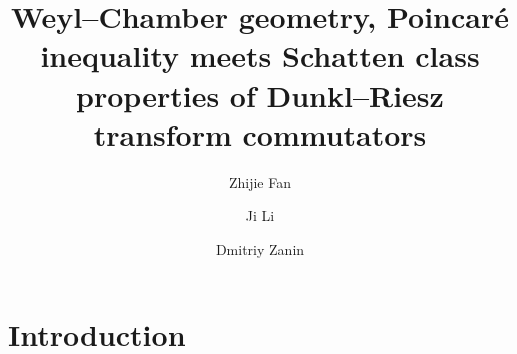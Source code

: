 \documentclass{amsart}
\begin{document}
\newtheorem{theorem}{Theorem}[section]
\newtheorem{proposition}[theorem]{Proposition}
\newtheorem{coro}[theorem]{Corollary}
\newtheorem{lemma}[theorem]{Lemma}
\newtheorem{definition}[theorem]{Definition}
\newtheorem{nota}[theorem]{Notation}
\newtheorem{assum}{Assumption}[section]
\newtheorem{example}[theorem]{Example}
\newtheorem{remark}[theorem]{Remark}


\title[Schatten class properties of Dunkl--Riesz transform commutators]{Weyl--Chamber geometry, Poincar\'e inequality meets Schatten class properties of Dunkl--Riesz transform commutators}



\author{Zhijie Fan}
\address{Zhijie Fan, School of Mathematical Sciences, South China Normal University, Guangzhou 510631, China}


\author{Ji Li}
\address{Ji Li, Department of Mathematics, Macquarie University,NSW2109, Australia}



\author{Dmitriy Zanin}
\address{School of Mathematics and Statistics, HNP-LAMA, Central South University, Changsha 410075, China}






\date{}





\begin{abstract}

\end{abstract}

\maketitle


\tableofcontents


\section{Introduction}
\end{document}
